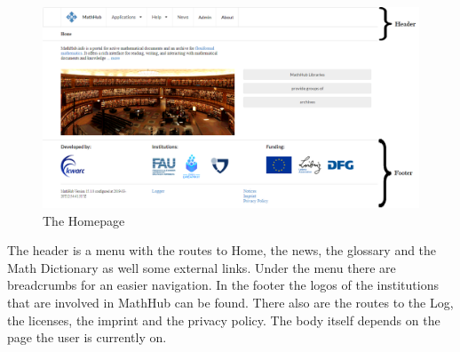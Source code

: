 \documentclass[11pt,a4paper]{article}
\begin{document}
\begin{figure}[H]
\includegraphics[width=1\textwidth]{home2.png}
\caption{The Homepage}
\label{fig:home}
\end{figure}

The header is a menu with the routes to Home, the news, the glossary and the Math Dictionary as well some external links.
Under the menu there are breadcrumbs for an easier navigation.
In the footer the logos of the institutions that are involved in MathHub can be found.
There also are the routes to the Log, the licenses, the imprint and the privacy policy.
The body itself depends on the page the user is currently on.
\end{document}
